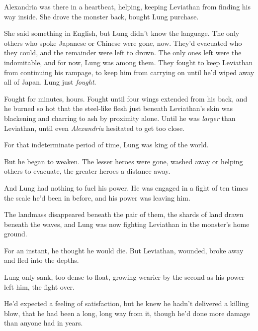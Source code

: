 Alexandria was there in a heartbeat, helping, keeping Leviathan from finding his way inside.  She drove the monster back, bought Lung purchase.



She said something in English, but Lung didn't know the language.  The only others who spoke Japanese or Chinese were gone, now.  They'd evacuated who they could, and the remainder were left to drown.  The only ones left were the indomitable, and for now, Lung was among them.  They fought to keep Leviathan from continuing his rampage, to keep him from carrying on until he'd wiped away all of Japan.  Lung just \emph{fought}.



Fought for minutes, hours.  Fought until four wings extended from his back, and he burned so hot that the steel-like flesh just beneath Leviathan's skin was blackening and charring to ash by proximity alone.  Until he was \emph{larger} than Leviathan, until even \emph{Alexandria }hesitated to get too close.



For that indeterminate period of time, Lung was king of the world.



But he began to weaken.  The lesser heroes were gone, washed away or helping others to evacuate, the greater heroes a distance away.



And Lung had nothing to fuel his power.  He was engaged in a fight of ten times the scale he'd been in before, and his power was leaving him.



The landmass disappeared beneath the pair of them, the shards of land drawn beneath the waves, and Lung was now fighting Leviathan in the monster's home ground.



For an instant, he thought he would die.  But Leviathan, wounded, broke away and fled into the depths.



Lung only sank, too dense to float, growing wearier by the second as his power left him, the fight over.



He'd expected a feeling of satisfaction, but he knew he hadn't delivered a killing blow, that he had been a long, long way from it, though he'd done more damage than anyone had in years.



